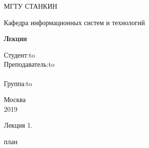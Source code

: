 \documentclass[a4paper]{article}
\begin{document}
    \begin{titlepage}
        \newpage
        
        \begin{center}
        МГТУ СТАНКИН \\
        \end{center}
        
        \vspace{8em}
        
        \begin{center}
        \Large Кафедра информационных систем и технологий \\ 
        \end{center}
        
        \vspace{2em}
        
        \begin{center}
        \textsc{\textbf{Лекции}}
        \end{center}
        
        \vspace{6em}
        
        
        
        \newbox{\lbox}
        \newlength{\maxl}
        \setlength{\maxl}{\wd\lbox}
        \hfill\parbox{11cm}{
        \hspace*{5cm}\hspace*{-5cm}Студент:\hfill\hbox to\\
        \hspace*{5cm}\hspace*{-5cm}Преподаватель:\hfill\hbox to\\
        \\
        \hspace*{5cm}\hspace*{-5cm}Группа:\hfill\hbox to\\}
        
        
        \vspace{\fill}
        
        \begin{center}
        Москва \\2019
        \end{center}
    
    \end{titlepage}
\newpage
\begin{center}
    \LARGE
        Лекция 1.\\
\end{center}
план
\end{document}
